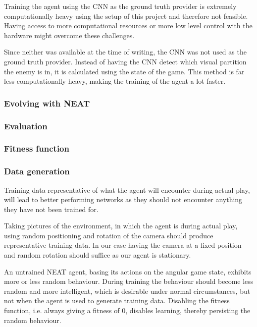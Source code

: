 Training the agent using the CNN as the ground truth provider is extremely computationally heavy using the setup of this project and therefore not feasible. Having access to more computational resources or more low level control with the hardware might overcome these challenges.

Since neither was available at the time of writing, the CNN was not used as the ground truth provider. Instead of having the CNN detect which visual partition the enemy is in, it is calculated using the state of the game. This method is far less computationally heavy, making the training of the agent a lot faster.

\subsubsection{Evolving with NEAT}

\subsubsection{Evaluation}

\subsubsection{Fitness function}

\subsubsection{Data generation}
\label{subsub:data-gen}
Training data representative of what the agent will encounter during actual play, will lead to better performing networks as they should not encounter anything they have not been trained for.

Taking pictures of the environment, in which the agent is during actual play, using random positioning and rotation of the camera should produce representative training data. In our case having the camera at a fixed position and random rotation should suffice as our agent is stationary.

An untrained NEAT agent, basing its actions on the angular game state, exhibits more or less random behaviour. During training the behaviour should become less random and more intelligent, which is desirable under normal circumstances, but not when the agent is used to generate training data. Disabling the fitness function, i.e. always giving a fitness of 0, disables learning, thereby persisting the random behaviour.

